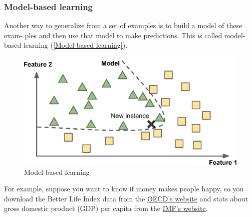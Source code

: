 \subsubsection{Model-based learning}
Another way to generalize from a set of examples is to build a model of these exam‐
ples and then use that model to make predictions. This is called model-based learning
(\autoref{Model-based learning}).
\begin{figure}
\centering
\includegraphics{img/Model-based learning.png}
\caption{Model-based learning}
\label{Model-based learning}
\end{figure}

For example, suppose you want to know if money makes people happy, so you download the Better Life Index data from the \href{https://stats.oecd.org/index.aspx?DataSetCode=BLI}{OECD’s website} and stats about gross domestic product (GDP) per capita from the \href{https://www.imf.org/en/Publications/SPROLLS/world-economic-outlook-databases#sort=\%40imfdate\%20descending}{IMF’s website}.
